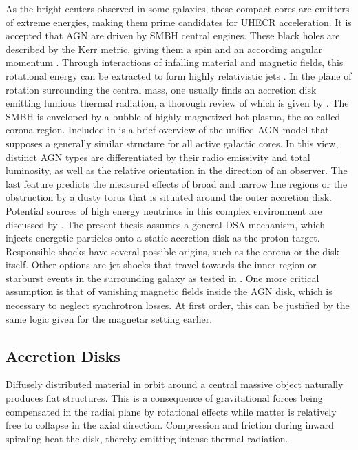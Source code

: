 As the bright centers observed in some galaxies, these compact cores are emitters of extreme energies, making them prime
candidates for UHECR acceleration. It is accepted that AGN are driven by SMBH central engines. These black holes are described
by the Kerr metric, giving them a spin and an according angular momentum \cite{Visser_2008}. Through interactions of
infalling material and magnetic fields, this rotational energy can be extracted to form highly relativistic jets \cite{Blandford_2019}.
In the plane of rotation surrounding the central mass, one usually finds an accretion disk emitting lumious thermal radiation,
a thorough review of which is given by \cite{Abramowicz_2013}. The SMBH is enveloped by a bubble of highly magnetized
hot plasma, the so-called corona region. Included in \cite{Beckmann_2013} is a brief overview of the unified AGN model that
supposes a generally similar structure for all active galactic cores. In this view, distinct AGN types are differentiated
by their radio emissivity and total luminosity, as well as the relative orientation in the direction of an observer. The
last feature predicts the measured effects of broad and narrow line regions or the obstruction by a dusty torus that is situated
around the outer accretion disk. Potential sources of high energy neutrinos in this complex environment are discussed by \cite{Murase_2023}.
The present thesis assumes a general DSA mechanism, which injects energetic particles onto a static accretion disk as the proton target.
Responsible shocks have several possible origins, such as the corona or the disk itself. Other options are jet shocks that travel
towards the inner region or starburst events in the surrounding galaxy as tested in \cite{Eichmann_2022}. One more critical assumption
is that of vanishing magnetic fields inside the AGN disk, which is necessary to neglect synchrotron losses. At first order, this can be
justified by the same logic given for the magnetar setting earlier.



\subsection{Accretion Disks}
\label{sub:accretion}

Diffusely distributed material in orbit around a central massive object naturally produces flat structures. This is a
consequence of gravitational forces being compensated in the radial plane by rotational effects while matter is relatively
free to collapse in the axial direction. Compression and friction during inward spiraling heat the disk, thereby emitting
intense thermal radiation.


